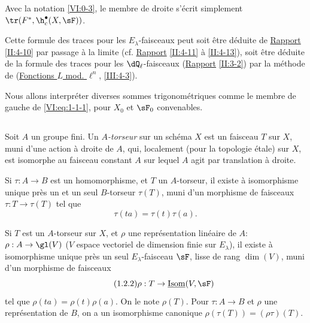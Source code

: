 Avec la notation \ref{VI:0-3}, le membre de droite s'écrit simplement 
$\tr(F^\ast,\h_c^\bullet(X,\sF))$. 

Cette formule des traces pour les $E_\lambda$-faisceaux peut soit être 
déduite de \hyperref[II]{Rapport} \ref{II:4-10} par passage à la limite (cf. 
\hyperref[II]{Rapport} \ref{II:4-11} à \ref{II:4-13}), soit être déduite 
de la formule des traces pour les $\dQ_\ell$-faisceaux (\hyperref[II]{Rapport} 
\ref{II:3-2}) par la méthode de (\hyperref[III]{Fonctions $L$ mod. $\ell^n$}, 
\ref{III:4-3}). 

Nous allons interpréter diverses sommes trigonométriques comme le membre de 
gauche de \eqref{VI:eq:1-1-1}, pour $X_0$ et $\sF_0$ convenables. 






\subsection{}\label{VI:1-2}

Soit $A$ un groupe fini. Un \emph{$A$-torseur} sur un schéma $X$ est un 
faisceau $T$ sur $X$, muni d'une action à droite de $A$, qui, localement 
(pour la topologie étale) sur $X$, est isomorphe au faisceau constant $A$ sur 
lequel $A$ agit par translation à droite. 

Si $\tau:A\to B$ est un homomorphisme, et $T$ un $A$-torseur, il existe à 
isomorphisme unique près un et un seul $B$-torseur $\tau(T)$, muni d'un 
morphisme de faisceaux $\tau:T\to \tau(T)$ tel que 
\begin{equation*}\tag{1.2.1}\label{VI:eq:1-2-1}
  \tau(t a) = \tau(t) \tau(a)\text{.}
\end{equation*}

Si $T$ est un $A$-torseur sur $X$, et $\rho$ une représentation linéaire 
de $A$: $\rho:A\to \gl(V)$ ($V$ espace vectoriel de dimension finie sur 
$E_\lambda$), il existe à isomorphisme unique près un seul 
$E_\lambda$-faisceau $\sF$, lisse de rang $\dim(V)$, muni d'un morphisme de 
faisceaux 
\begin{equation*}\tag{1.2.2}\label{VI:eq:1-2-2}
  \rho:T\to \underline{\operatorname{Isom}}(V,\sF)
\end{equation*}
tel que $\rho(t a) = \rho(t) \rho(a)$. On le note $\rho(T)$. Pour 
$\tau:A\to B$ et $\rho$ une représentation de $B$, on a un isomorphisme 
canonique $\rho(\tau(T)) = (\rho\tau)(T)$. 

